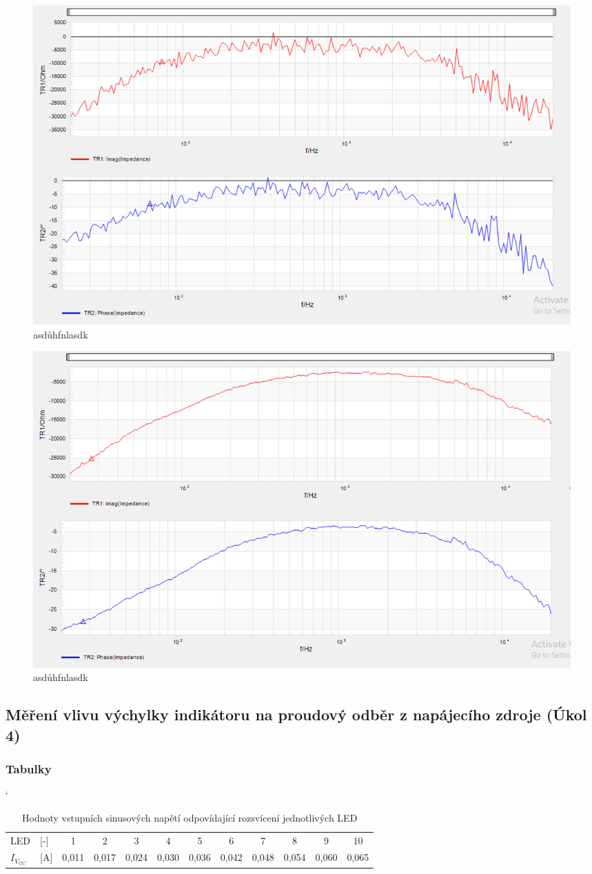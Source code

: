 \documentclass[a4paper, czech]{article}
\begin{document}
\begin{figure}[H]
    \centering
    \includegraphics[width=\textwidth]{impedance_uloha8.png}
    \caption{asdůhfnlasdk}
\end{figure}

\begin{figure}[H]
    \centering
    \includegraphics[width=\textwidth]{impedance_13dbm_uloha8.png}
    \caption{asdůhfnlasdk}
\end{figure}

\subsection{Měření vlivu výchylky indikátoru na proudový odběr z napájecího zdroje (Úkol 4)}

\subsubsection{Tabulky}

\begin{table}[H]
    \catcode`
    \centering
    \caption{Hodnoty vstupních sinusových napětí odpovídající rozsvícení jednotlivých LED}
    \begin{tabular}{ll|cccccccccc}
        \toprule
        LED & [-]              & 1     & 2     & 3     & 4     & 5     & 6     & 7     & 8     & 9     & 10    \\
        \cmidrule(rl){1-12}
        $I_{V_{\text{CC}}}$ & {[}A{]} & 0,011 & 0,017 & 0,024 & 0,030 & 0,036 & 0,042 & 0,048 & 0,054 & 0,060 & 0,065 \\
        \bottomrule
    \end{tabular}
\end{table}
\end{document}
